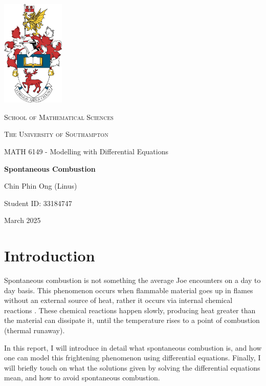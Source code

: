 \documentclass[12pt]{article}
\begin{document}
\onehalfspacing
\begin{titlepage}
    \centering
    \includegraphics[width=3cm]{crest.jpg}\par
    \vspace{0.3cm}
    {\scshape\Large School of Mathematical Sciences \par}
    \vspace{0.25cm}
    {\scshape\Large The University of Southampton \par}
    \vspace{0.25cm}
    {\Large MATH 6149 - Modelling with Differential Equations \par}
    \vspace{0.5cm}
    {\huge\bfseries Spontaneous Combustion \par}
    \vspace{0.5cm}

    {\Large Chin Phin Ong (Linus) \par}
    \vspace{0.25cm}
    {\large Student ID: 33184747 \par}
    {\large  \par}
    \vfill
    {\large March 2025 \par}
\end{titlepage}

\section{Introduction}
Spontaneous combustion is not something the average Joe encounters on a day to day basis. This phenomenon occurs when flammable material goes up in flames without an external source of heat, rather it occurs via internal chemical reactions \cite{SPEIGHT2011355}. These chemical reactions happen slowly, producing heat greater than the material can dissipate it, until the temperature rises to a point of combustion (thermal runaway). 

In this report, I will introduce in detail what spontaneous combustion is, and how one can model this frightening phenomenon using differential equations. Finally, I will briefly touch on what the solutions given by solving the differential equations mean, and how to avoid spontaneous combustion.
\end{document}
